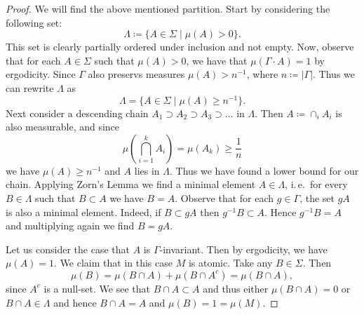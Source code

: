 \begin{proof}
  We will find the above mentioned partition. Start by considering the following set:
  \[
    \Lambda \coloneqq \{A \in \Sigma \mid \mu(A) > 0\}.
  \]
  This set is clearly partially ordered under inclusion and not empty. Now, observe that for each \(A \in \Sigma\) such that \(\mu(A) > 0\), we have that \(\mu(\Gamma \cdot A) = 1\) by ergodicity. Since \(\Gamma\) also preservs measures \(\mu(A) > n^{-1}\), where \(n \coloneqq |\Gamma|\). Thus we can rewrite \(\Lambda\) as
  \[
    \Lambda = \{A \in \Sigma \mid \mu(A) \geq n^{-1}\}.
  \]
  Next consider a descending chain \(A_1 \supset A_2 \supset A_3 \supset \dots\) in \(\Lambda\). Then \(A \coloneqq \cap_i A_i\) is also measurable, and since
  \[
    \mu\left(\bigcap_{i=1}^k A_i \right) = \mu(A_k) \geq \frac1n
  \]
  we have \(\mu(A) \geq n^{-1}\) and \(A\) lies in \(\Lambda\). Thus we have found a lower bound for our chain. Applying Zorn's Lemma we find a minimal element \(A \in \Lambda\), i.\,e.\ for every \(B \in \Lambda\) such that \(B \subset A\) we have \(B = A\). Observe that for each \(g \in \Gamma\), the set \(gA\) is also a minimal element. Indeed, if \(B \subset gA\) then \(g^{-1} B \subset A\). Hence \(g^{-1}B = A\) and multiplying again we find \(B = gA\).

  Let us consider the case that \(A\) is \(\Gamma\)-invariant. Then by ergodicity, we have \(\mu(A) = 1\). We claim that in this case \(M\) is atomic. Take any \(B \in \Sigma\).
  Then
  \[
    \mu(B) = \mu(B \cap A) + \mu(B \cap A^c) = \mu(B \cap A),
  \]
  since \(A^c\) is a null-set. We see that \(B \cap A \subset A\) and thus either \(\mu(B \cap A) = 0\) or \(B  \cap A \in \Lambda\) and hence \(B \cap A = A\) and \(\mu(B) = 1 = \mu(M)\).


\end{proof}
